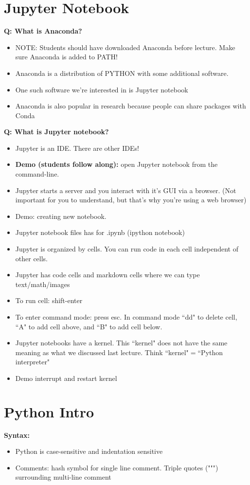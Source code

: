 \documentclass[12pt]{article}
\numberwithin{equation}{section}
\begin{document}
\section{Jupyter Notebook}
\textbf{Q: What is Anaconda?}
\begin{itemize}
    \item NOTE: Students should have downloaded Anaconda before lecture. Make sure Anaconda is added to PATH!
    \item Anaconda is a distribution of PYTHON with some additional software. 
    \item One such software we're interested in is Jupyter notebook
    \item Anaconda is also popular in research because people can share packages with Conda
\end{itemize}

\textbf{Q: What is Jupyter notebook?}
\begin{itemize}
    \item Jupyter is an IDE. There are other IDEs!
    \item \textbf{Demo (students follow along):} open Jupyter notebook from the command-line.
    \item Jupyter starts a server and you interact with it's GUI via a browser. (Not important for you to understand, but that's why you're using a web browser)
    \item Demo: creating new notebook.
    \item Jupyter notebook files has for .ipynb (ipython notebook)
    \item Jupyter is organized by cells. You can run code in each cell independent of other cells.
    \item Jupyter has code cells and markdown cells where we can type text/math/images
    \item To run cell: shift-enter
    \item To enter command mode: press esc. In command mode ``dd" to delete cell, ``A" to add cell above, and ``B" to add cell below.
    \item Jupyter notebooks have a kernel. This ``kernel" does not have the same meaning as what we discussed last lecture. Think ``kernel"$=$``Python interpreter"
    \item Demo interrupt and restart kernel
\end{itemize}

\section{Python Intro}
\textbf{Syntax:}
\begin{itemize}
    \item Python is case-sensitive and indentation sensitive
    \item Comments: hash symbol for single line comment. Triple quotes (""") surrounding multi-line comment
\end{itemize}
\end{document}
